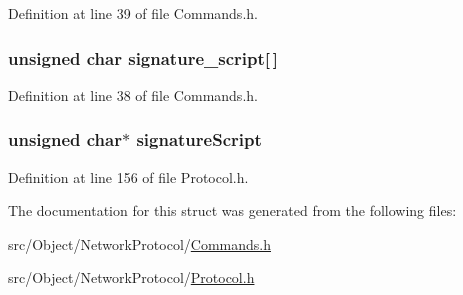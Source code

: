 Definition at line 39 of file Commands.h.

\hypertarget{struct_tranx_in_acd5b457285f7e816fbb23777406a701a}{
\subsubsection[{signature\_\-script}]{\setlength{\rightskip}{0pt plus 5cm}unsigned char {\bf signature\_\-script}\mbox{[}$\,$\mbox{]}}}
\label{struct_tranx_in_acd5b457285f7e816fbb23777406a701a}


Definition at line 38 of file Commands.h.

\hypertarget{struct_tranx_in_a3d518a810ef5d47feb63829a61ced9e1}{
\subsubsection[{signatureScript}]{\setlength{\rightskip}{0pt plus 5cm}unsigned char$\ast$ {\bf signatureScript}}}
\label{struct_tranx_in_a3d518a810ef5d47feb63829a61ced9e1}


Definition at line 156 of file Protocol.h.



The documentation for this struct was generated from the following files:\begin{DoxyCompactItemize}
\item 
src/Object/NetworkProtocol/\hyperlink{_commands_8h}{Commands.h}\item 
src/Object/NetworkProtocol/\hyperlink{_protocol_8h}{Protocol.h}\end{DoxyCompactItemize}
